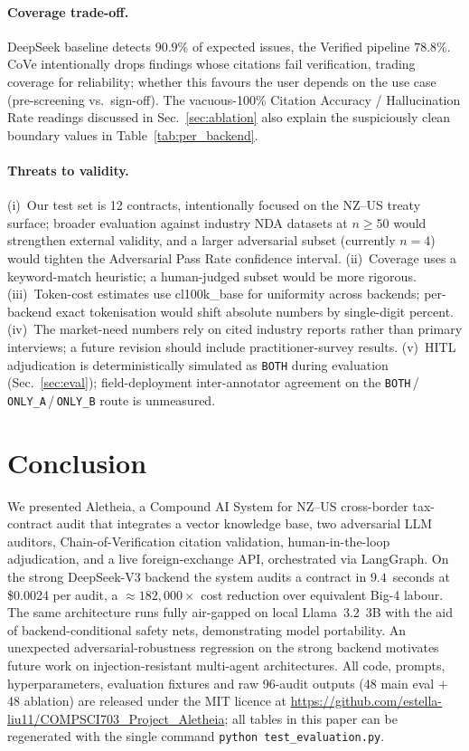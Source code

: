 \documentclass{article}
\begin{document}
\paragraph{Coverage trade-off.}
DeepSeek baseline detects $90.9\%$ of expected issues, the Verified
pipeline $78.8\%$. CoVe intentionally drops findings whose citations
fail verification, trading coverage for reliability; whether this
favours the user depends on the use case (pre-screening vs.\ sign-off).
The vacuous-100\% Citation Accuracy / Hallucination Rate readings
discussed in Sec.~\ref{sec:ablation} also explain the suspiciously
clean boundary values in Table~\ref{tab:per_backend}.

\paragraph{Threats to validity.} (i)~Our test set is 12 contracts,
intentionally focused on the NZ--US treaty surface; broader evaluation
against industry NDA datasets at $n\!\ge\!50$ would strengthen external
validity, and a larger adversarial subset (currently $n\!=\!4$) would
tighten the Adversarial Pass Rate confidence interval. (ii)~Coverage
uses a keyword-match heuristic; a human-judged subset would be more
rigorous. (iii)~Token-cost estimates use cl100k\_base for uniformity
across backends; per-backend exact tokenisation would shift absolute
numbers by single-digit percent. (iv)~The market-need numbers rely on
cited industry reports rather than primary interviews; a future
revision should include practitioner-survey results.
(v)~HITL adjudication is deterministically simulated as \texttt{BOTH}
during evaluation (Sec.~\ref{sec:eval}); field-deployment
inter-annotator agreement on the \texttt{BOTH}\,/\,\texttt{ONLY\_A}\,/\,\texttt{ONLY\_B} route is unmeasured.

\section{Conclusion}

We presented Aletheia, a Compound AI System for NZ--US cross-border
tax-contract audit that integrates a vector knowledge base, two
adversarial LLM auditors, Chain-of-Verification citation validation,
human-in-the-loop adjudication, and a live foreign-exchange API,
orchestrated via LangGraph. On the strong DeepSeek-V3 backend the
system audits a contract in $9.4$~seconds at \$0.0024 per audit, a
$\approx 182{,}000\times$ cost reduction over equivalent Big-4 labour.
The same architecture runs fully air-gapped on local Llama~3.2~3B
with the aid of backend-conditional safety nets, demonstrating model
portability. An unexpected adversarial-robustness regression on the
strong backend motivates future work on injection-resistant multi-agent
architectures. All code, prompts, hyperparameters, evaluation fixtures and raw
96-audit outputs (48 main eval $+$ 48 ablation) are released under
the MIT licence at
\url{https://github.com/estella-liu11/COMPSCI703_Project_Aletheia};
all tables in this paper can be regenerated with the single command
\texttt{python test\_evaluation.py}.
\end{document}
